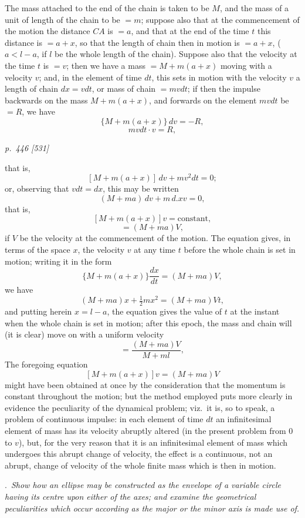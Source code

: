 \documentclass[11pt,a4paper]{article}
\theoremstyle{plain}
\theoremstyle{definition}
\newcommand{\dd}{\,d}
\begin{document}
\medskip

The mass attached to the end of the chain is taken to be $M$, and the mass of
a unit of length of the chain to be $=m$; suppose also that at the commencement
of the motion the distance $CA$ is $=a$, and that at the end of the time $t$ this distance
is $=a+x$, so that the length of chain then in motion is $=a+x$, ($a < l - a$, if $l$ be
the whole length of the chain). Suppose also that the velocity at the time $t$ is $=v$;
then we have a mass $=M+m(a+x)$ moving with a velocity $v$; and, in the element
of time $dt$, this sets in motion with the velocity $v$ a length of chain $dx = vdt$, or mass
of chain $= mvdt$; if then the impulse backwards on the mass $M+m(a+x)$, and
forwards on the element $mvdt$ be $=R$, we have
\[
\{M+m(a+x)\}\dd v = -R,
\]
\[
mvdt \cdot v = R,
\]

\clearpage

\bigskip
\textit{p.~446 [531]}
\smallskip

that is,
\[
[M+m(a+x)]\,dv + mv^2dt = 0;
\]
or, observing that $vdt = dx$, this may be written
\[
(M+ma)\,dv + m\,d.xv = 0,
\]
that is,
\[
[M+m(a+x)]v = \text{constant},
\]
\[
= (M+ma)V,
\]
if $V$ be the velocity at the commencement of the motion. The equation gives, in
terms of the space $x$, the velocity $v$ at any time $t$ before the whole chain is set in
motion; writing it in the form
\[
\{M+m(a+x)\}\frac{dx}{dt} = (M+ma)V,
\]
we have
\[
(M+ma)x+\tfrac{1}{2}mx^2 = (M+ma)Vt,
\]
and putting herein $x = l - a$, the equation gives the value of $t$ at the instant when
the whole chain is set in motion; after this epoch, the mass and chain will (it is
clear) move on with a uniform velocity
\[
= \frac{(M+ma)V}{M+ml},
\]
The foregoing equation
\[
[M+m(a+x)]v = (M+ma)V
\]
might have been obtained at once by the consideration that the momentum is constant
throughout the motion; but the method employed puts more clearly in evidence the
peculiarity of the dynamical problem; viz.\ it is, so to speak, a problem of continuous
impulse: in each element of time $dt$ an infinitesimal element of mass has its velocity
abruptly altered (in the present problem from $0$ to $v$), but, for the very reason that
it is an infinitesimal element of mass which undergoes this abrupt change of velocity,
the effect is a continuous, not an abrupt, change of velocity of the whole finite mass
which is then in motion.

\medskip
{}.\ \textit{Show how an ellipse may be constructed as the envelope of a variable circle
having its centre upon either of the axes; and examine the geometrical peculiarities which
occur according as the major or the minor axis is made use of.}
\end{document}
